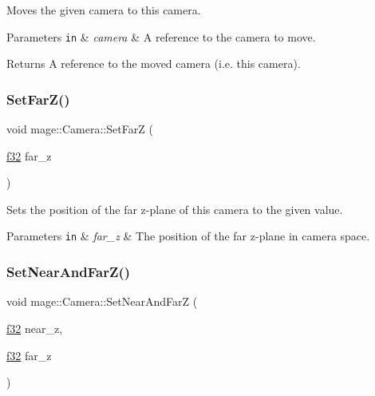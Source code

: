 Moves the given camera to this camera.


\begin{DoxyParams}[1]{Parameters}
\mbox{\tt in}  & {\em camera} & A reference to the camera to move. \\
\hline
\end{DoxyParams}
\begin{DoxyReturn}{Returns}
A reference to the moved camera (i.\+e. this camera). 
\end{DoxyReturn}
\hypertarget{classmage_1_1_camera_adadd1afb821048429602bde76171ea05}{}\label{classmage_1_1_camera_adadd1afb821048429602bde76171ea05} 
\subsubsection{\texorpdfstring{Set\+Far\+Z()}{SetFarZ()}}
{\footnotesize\ttfamily void mage\+::\+Camera\+::\+Set\+FarZ (\begin{DoxyParamCaption}\item[{\hyperlink{namespacemage_a6a44ad388483959dc4dff9f2aef91431}{f32}}]{far\+\_\+z }\end{DoxyParamCaption})\hspace{0.3cm}{\ttfamily [noexcept]}}

Sets the position of the far z-\/plane of this camera to the given value.


\begin{DoxyParams}[1]{Parameters}
\mbox{\tt in}  & {\em far\+\_\+z} & The position of the far z-\/plane in camera space. \\
\hline
\end{DoxyParams}
\hypertarget{classmage_1_1_camera_a90bfe6b0f74fe8362175b9bec41c4fe8}{}\label{classmage_1_1_camera_a90bfe6b0f74fe8362175b9bec41c4fe8} 
\subsubsection{\texorpdfstring{Set\+Near\+And\+Far\+Z()}{SetNearAndFarZ()}}
{\footnotesize\ttfamily void mage\+::\+Camera\+::\+Set\+Near\+And\+FarZ (\begin{DoxyParamCaption}\item[{\hyperlink{namespacemage_a6a44ad388483959dc4dff9f2aef91431}{f32}}]{near\+\_\+z,  }\item[{\hyperlink{namespacemage_a6a44ad388483959dc4dff9f2aef91431}{f32}}]{far\+\_\+z }\end{DoxyParamCaption})\hspace{0.3cm}{\ttfamily [noexcept]}}


